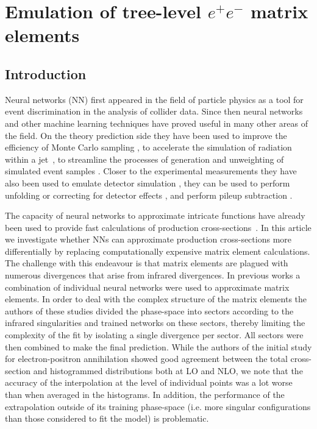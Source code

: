\documentclass[main.tex]{subfiles}
\begin{document}
\chapter{Emulation of tree-level $e^{+}e^{-}$ matrix elements}
\label{chapter:fame1}

\section{Introduction}
\label{sec:intro}
Neural networks (NN) first appeared in the field of particle physics as a tool for event discrimination in the analysis of collider data. 
Since then neural networks and other machine learning techniques have proved useful in many other areas of the field. 
On the theory prediction side they have been used 
to improve the efficiency of Monte Carlo sampling \cite{Bendavid:2017zhk,Klimek:2018mza,Bothmann:2020ywa,Verheyen:2020bjw,Chen_2021}, 
to accelerate the simulation of radiation within a jet~\cite{Carrazza:2019cnt,Bothmann:2018trh,Dohi:2020eda}, 
to streamline the processes of generation and unweighting of simulated event samples 
\cite{Gao:2020zvv,Otten:2018kum,Hashemi:2019fkn,DiSipio:2019imz,Butter:2019cae,Bishara:2019iwh,Backes:2020vka,Butter:2020qhk,Alanazi:2020klf,Nachman:2020fff}.
Closer to the experimental measurements 
they have also been used to emulate detector simulation \cite{Paganini:2017dwg,SHiP:2019gcl,Derkach:2019qfk,Alanazi:2020jod},
 they can be used to perform unfolding \cite{Andreassen:2019cjw} or correcting for detector effects \cite{Bellagente:2019uyp},
and perform pileup subtraction \cite{Andreassen:2019cjw}. 

The capacity of neural networks to approximate intricate functions have already been 
used to provide fast calculations of production cross-sections~\cite{otten2019deepxs,Buckley:2020bxg}.
In this article we investigate whether NNs can approximate production cross-sections more differentially by replacing computationally expensive 
matrix element calculations. 
The challenge with this endeavour is that matrix elements are plagued with numerous divergences that arise from infrared divergences.
In previous works \cite{Badger:2020uow,Aylett-Bullock:2021hmo} a combination of individual neural networks were used 
to approximate matrix elements. In order to deal with the complex structure of the matrix elements 
the authors of these studies divided the phase-space into sectors according to the infrared singularities and trained networks on these sectors,
thereby limiting the complexity of the fit by isolating a single divergence per sector. All sectors were then combined to make the final prediction.
While the authors of the initial study for electron-positron annihilation showed good agreement between the total cross-section and histogrammed distributions both at LO and NLO,
we note that the accuracy of the interpolation at the level of individual points was a lot worse than when averaged in the 
histograms. In addition, the performance of the extrapolation outside of its training phase-space 
(i.e. more singular configurations than those considered to fit the model) is problematic.   
\end{document}
